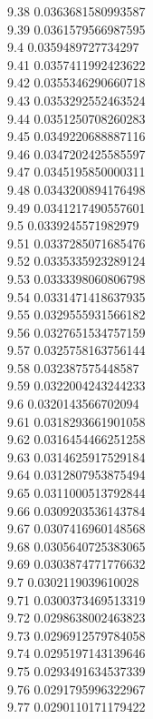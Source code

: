 {9.38	0.0363681580993587\\
9.39	0.0361579566987595\\
9.4	0.0359489727734297\\
9.41	0.0357411992423622\\
9.42	0.0355346290660718\\
9.43	0.0353292552463524\\
9.44	0.0351250708260283\\
9.45	0.0349220688887116\\
9.46	0.0347202425585597\\
9.47	0.0345195850000311\\
9.48	0.0343200894176498\\
9.49	0.0341217490557601\\
9.5	0.0339245571982979\\
9.51	0.0337285071685476\\
9.52	0.0335335923289124\\
9.53	0.0333398060806798\\
9.54	0.0331471418637935\\
9.55	0.0329555931566182\\
9.56	0.0327651534757159\\
9.57	0.0325758163756144\\
9.58	0.032387575448587\\
9.59	0.0322004243244233\\
9.6	0.0320143566702094\\
9.61	0.0318293661901058\\
9.62	0.0316454466251258\\
9.63	0.0314625917529184\\
9.64	0.0312807953875494\\
9.65	0.0311000513792844\\
9.66	0.0309203536143784\\
9.67	0.0307416960148568\\
9.68	0.0305640725383065\\
9.69	0.0303874771776632\\
9.7	0.0302119039610028\\
9.71	0.0300373469513319\\
9.72	0.0298638002463823\\
9.73	0.0296912579784058\\
9.74	0.0295197143139646\\
9.75	0.0293491634537339\\
9.76	0.0291795996322967\\
9.77	0.0290110171179422\\
}
